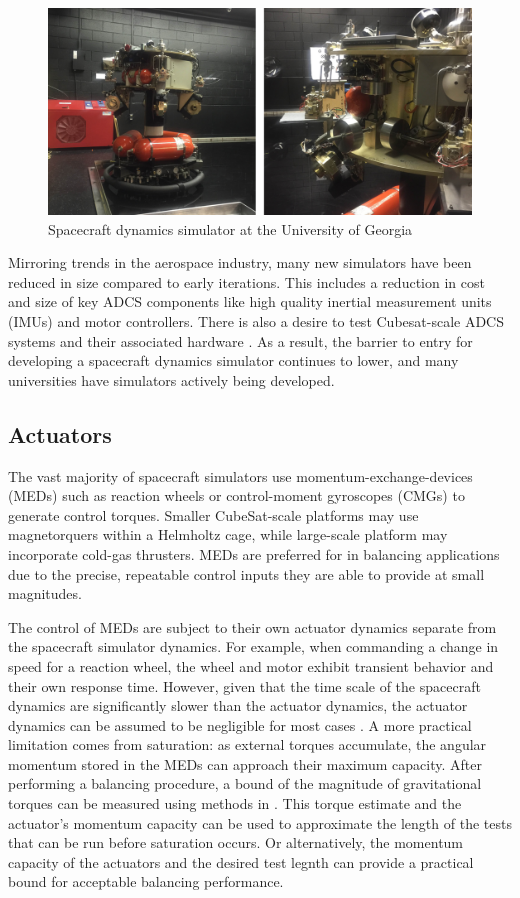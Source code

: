 \begin{figure}[h]
    \centering
    \includegraphics[width=0.80\linewidth]{figures/georgia.png}
    \caption{Spacecraft dynamics simulator at the University of Georgia}
    \label{fig:georgia}
\end{figure}

Mirroring trends in the aerospace industry, many new simulators have been reduced in size compared to early iterations. This includes a reduction in cost and size of key ADCS components like high quality inertial measurement units (IMUs) and motor controllers. There is also a desire to test Cubesat-scale ADCS systems and their associated hardware \cite{chesi_automatic_2014} \cite{kwan2015air}. As a result, the barrier to entry for developing a spacecraft dynamics simulator continues to lower, and many universities have simulators actively being developed. 

\subsection{Actuators}

The vast majority of spacecraft simulators use momentum-exchange-devices (MEDs) such as reaction wheels or control-moment gyroscopes (CMGs) to generate control torques. Smaller CubeSat-scale platforms may use magnetorquers within a Helmholtz cage, while large-scale platform may incorporate cold-gas thrusters. MEDs are preferred for in balancing applications due to the precise, repeatable control inputs they are able to provide at small magnitudes. 

The control of MEDs are subject to their own actuator dynamics separate from the spacecraft simulator dynamics. For example, when commanding a change in speed for a reaction wheel, the wheel and motor exhibit transient behavior and their own response time. However, given that the time scale of the spacecraft dynamics are significantly slower than the actuator dynamics, the actuator dynamics can be assumed to be negligible for most cases \cite{kristiansen_modelling_2009}. A more practical limitation comes from saturation: as external torques accumulate, the angular momentum stored in the MEDs can approach their maximum capacity. After performing a balancing procedure, a bound of the magnitude of gravitational torques can be measured using methods in . This torque estimate and the actuator's momentum capacity can be used to approximate the length of the tests that can be run before saturation occurs. Or alternatively, the momentum capacity of the actuators and the desired test legnth can provide a practical bound for acceptable balancing performance.

